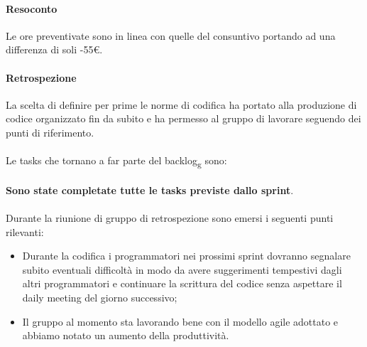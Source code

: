 \paragraph{Resoconto}
Le ore preventivate sono in linea con quelle del consuntivo portando ad una differenza di soli -55\euro.

\paragraph{Retrospezione}
La scelta di definire per prime le norme di codifica ha portato alla produzione di codice organizzato fin da subito e ha permesso al gruppo di lavorare seguendo dei punti di 
riferimento.
\\\\
Le tasks che tornano a far parte del backlog\textsubscript{g} sono:
\\\\
\textbf{Sono state completate tutte le tasks previste dallo sprint}.
\\\\
\noindent Durante la riunione di gruppo di retrospezione sono emersi i seguenti punti rilevanti:
\begin{itemize}
	\item Durante la codifica i programmatori nei prossimi sprint dovranno segnalare subito eventuali difficoltà in modo da avere suggerimenti tempestivi dagli altri 
	programmatori e continuare la scrittura del codice senza aspettare il daily meeting del giorno successivo;
	\item Il gruppo al momento sta lavorando bene con il modello agile adottato e abbiamo notato un aumento della produttività.
\end{itemize}